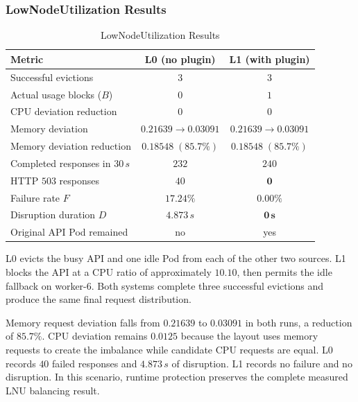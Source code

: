 \subsubsection{LowNodeUtilization Results}
\label{subsec:actualusage4_lnu_results}
\begin{table}[tbp]
    \centering
    \caption{LowNodeUtilization Results}
    \label{tab:actualusage4_lnu}
    \renewcommand{\arraystretch}{1.2}
    \small
    \begin{tabular}{@{}l c c@{}}
        \toprule
        \textbf{Metric} & \textbf{L0 (no plugin)} & \textbf{L1 (with plugin)} \\
        \midrule
        Successful evictions             & \(3\)                 & \(3\) \\
        Actual usage blocks (\(B\))       & \(0\)                 & \(1\) \\
        CPU deviation reduction          & \(0\)                 & \(0\) \\
        Memory deviation                 & \(0.21639 \to 0.03091\)& \(0.21639 \to 0.03091\) \\
        Memory deviation reduction       & \(0.18548\;(85.7\%)\) & \(0.18548\;(85.7\%)\) \\
        Completed responses in \(30\,s\) & \(232\)               & \(240\) \\
        HTTP \(503\) responses            & \(40\)                & \(\mathbf{0}\) \\
        Failure rate \(F\)                & \(17.24\%\)           & \(\mathbf{0.00\%}\) \\
        Disruption duration \(D\)         & \(4.873\,s\)          & \(\mathbf{0\,s}\) \\
        Original API Pod remained         & no                    & yes \\
        \bottomrule
    \end{tabular}
\end{table}

L0 evicts the busy API and one idle Pod from each of the other two sources. L1 blocks the API at a CPU ratio of approximately \(10.10\), then permits the idle fallback on worker-6. Both systems complete three successful evictions and produce the same final request distribution.

Memory request deviation falls from \(0.21639\) to \(0.03091\) in both runs, a reduction of \(85.7\%\). CPU deviation remains \(0.0125\) because the layout uses memory requests to create the imbalance while candidate CPU requests are equal. L0 records \(40\) failed responses and \(4.873\,s\) of disruption. L1 records no failure and no disruption. In this scenario, runtime protection preserves the complete measured LNU balancing result.

